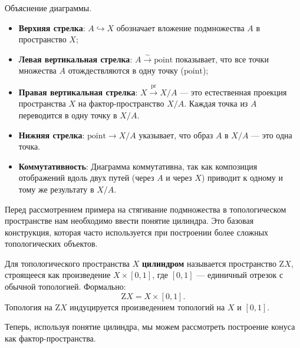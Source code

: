 \begin{remark}[Об обозначениях]
	Объяснение диаграммы.
	\begin{itemize}
		\item \textbf{Верхняя стрелка}: $ A \hookrightarrow X $ обозначает вложение подмножества $ A $ в пространство $ X $;
		
		\item \textbf{Левая вертикальная стрелка}: $ A \xrightarrow{\sim} \mathrm{point} $ показывает, что все точки множества $ A $ отождествляются в одну точку ($\mathrm{point}$);
		
		\item \textbf{Правая вертикальная стрелка}: $ X \xrightarrow{\mathrm{pr}} X/A $ — это естественная проекция пространства $ X $ на фактор-пространство $ X/A $. Каждая точка из $ A $ переводится в одну точку в $ X/A $.
		
		\item \textbf{Нижняя стрелка}: $ \mathrm{point} \to X/A $ указывает, что образ $ A $ в $ X/A $ — это одна точка.
		
		\item \textbf{Коммутативность}: Диаграмма коммутативна, так как композиция отображений вдоль двух путей (через $ A $ и через $ X $) приводит к одному и тому же результату в $ X/A $.
	\end{itemize}	
\end{remark}

Перед рассмотрением примера на стягивание подмножества в топологическом пространстве нам необходимо ввести понятие цилиндра. Это базовая конструкция, которая часто используется при построении более сложных топологических объектов.

\begin{definition}
    Для топологического пространства $ X $ \textbf{цилиндром} называется пространство $ \mathrm{Z}X $, строящееся как произведение $ X \times [0, 1] $, где $ [0, 1] $ — единичный отрезок с обычной топологией. Формально:
    \[
    \mathrm{Z}X = X \times [0, 1].
    \]
    Топология на $ \mathrm{Z}X $ индуцируется произведением топологий на $ X $ и $ [0, 1] $.
\end{definition}

Теперь, используя понятие цилиндра, мы можем рассмотреть построение конуса как фактор-пространства.

